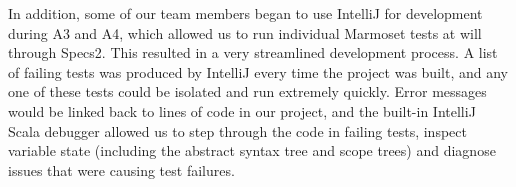 \documentclass[letterpaper]{article}
\begin{document}
  In addition, some of our team members began to use IntelliJ for development
  during A3 and A4, which allowed us to run individual Marmoset tests at will
  through Specs2. This resulted in a very streamlined development process. A
  list of failing tests was produced by IntelliJ every time the project was
  built, and any one of these tests could be isolated and run extremely
  quickly. Error messages would be linked back to lines of code in our
  project, and the built-in IntelliJ Scala debugger allowed us to step through
  the code in failing tests, inspect variable state (including the abstract
  syntax tree and scope trees) and diagnose issues that were causing test
  failures.
\end{document}
